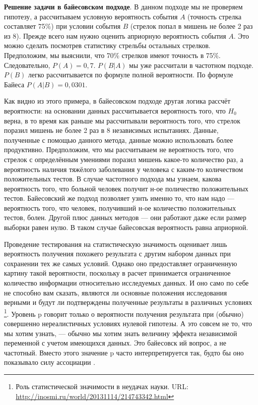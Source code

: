\textbf{Решение задачи в байесовском подходе}. В данном подходе мы не проверяем гипотезу, а рассчитываем условную вероятность события $A$ (точность стрелка составляет 75\%) при условии события $B$ (стрелок попал в мишень не более 2 раз из 8). Прежде всего нам нужно оценить априорную вероятность события $A$. Это можно сделать посмотрев статистику стрельбы остальных стрелков. Предположим, мы выяснили, что 70\% стрелков имеют точность в 75\%. Следовательно, $P(A)=0,7$. $P(B|A)$ мы уже рассчитали в частотном подходе. $P(B)$ легко рассчитывается по формуле полной вероятности. По формуле Байеса $P(A|B)=0,0301$. 

Как видно из этого примера, в байесовском подходе другая логика рассчёт вероятности: на основании данных рассчитывается вероятность того, что $H_{0}$ верна, в то время как раньше мы рассчитывали вероятность того, что стрелок поразил мишень не более 2 раз в 8 независимых испытаниях. Данные, полученные с помощью данного метода, данные можно использовать более продуктивно. Предположим, что мы рассчитываем не вероятность того, что стрелок с определённым умениями поразил мишень какое-то количество раз, а вероятность наличия тяжёлого заболевания у человека с каким-то количеством положительных тестов. В случае частотного подхода мы узнаем, какова вероятность того, что больной человек получит н-ое поличество положительных тестов. Байесовский же подход позволяет узнть именно то, что нам надо --- вероятность того, что человек, получивший н-ое количество положительных тестов, болен. Другой плюс данных методов --- они работают даже если размер выборки равен нулю. В таком случае байесовская вероятность равна априорной.

Проведение тестирования на статистическую значимость оценивает лишь вероятность получения похожего результата с другим набором данных при сохранении тех же самых условий. Однако оно предоставляет ограниченную картину такой вероятности, поскольку в расчет принимается ограниченное количество информации относительно исследуемых данных. И оно само по себе не способно вам сказать, являются ли основные положения исследования верными и будут ли подтверждены полученные результаты в различных условиях \footnote{Роль статистической значимости в неудачах науки. URL: \url{http://inosmi.ru/world/20131114/214743342.html}}. Уровень p говорит только о вероятности получения результата при (обычно) совершенно нереалистичных условиях нулевой гипотезы. А это совсем не то, что мы хотим узнать, --- обычно мы хотим знать величину эффекта независимой переменной с учетом имеющихся данных. Это байесовск ий вопрос, а не частотный. Вместо этого значение p часто интерпретируется так, будто бы оно показывало силу ассоциации \cite[стр. 11]{Schrodt2010}.

